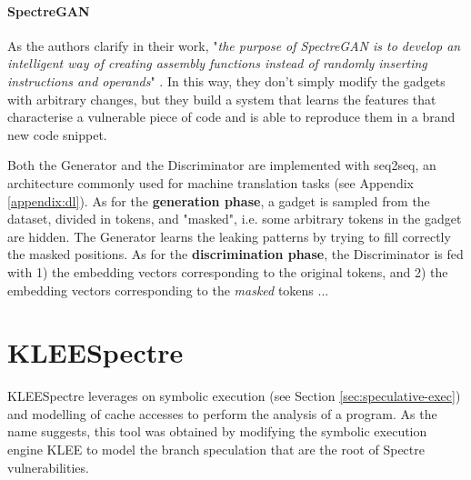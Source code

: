 \documentclass[12pt,a4paper]{book}
\theoremstyle{definition}
\begin{document}
	\paragraph{SpectreGAN}
	As the authors clarify in their work, "\textit{the purpose of SpectreGAN is to develop an intelligent way of creating assembly functions instead of randomly inserting instructions and operands}" \cite{Tol2021}. In this way, they don't simply modify the gadgets with arbitrary changes, but they build a system that learns the features that characterise a vulnerable piece of code and is able to reproduce them in a brand new code snippet.
	
	Both the Generator and the Discriminator are implemented with seq2seq, an architecture commonly used for machine translation tasks (see Appendix \ref{appendix:dl}). As for the \textbf{generation phase}, a gadget is sampled from the dataset, divided in tokens, and "masked", i.e. some arbitrary tokens in the gadget are hidden. The Generator learns the leaking patterns by trying to fill correctly the masked positions. As for the \textbf{discrimination phase}, the Discriminator is fed with 1) the embedding vectors corresponding to the original tokens, and 2) the embedding vectors corresponding to the \textit{masked} tokens ...
	
	
	\section{KLEESpectre}\label{sec:kleespectre}
	KLEESpectre \cite{Wang2019} leverages on symbolic execution (see Section \ref{sec:speculative-exec}) and modelling of cache accesses to perform the analysis of a program. As the name suggests, this tool was obtained by modifying the symbolic execution engine KLEE \cite{Cadar2008} to model the branch speculation that are the root of Spectre vulnerabilities. 
\end{document}
